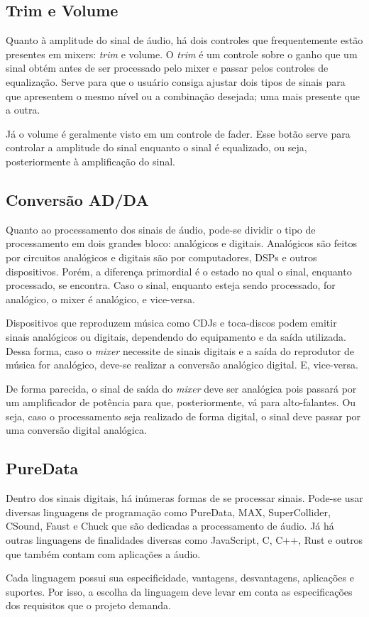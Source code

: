 \subsection{Trim e Volume}
Quanto à amplitude do sinal de áudio, há dois controles que frequentemente estão presentes em mixers: \textit{trim} e volume. O \textit{trim} é um controle sobre o ganho que um sinal obtém antes de ser processado pelo mixer e passar pelos controles de equalização. Serve para que o usuário consiga ajustar dois tipos de sinais para que apresentem o mesmo nível ou a combinação desejada; uma mais presente que a outra.
\par
Já o volume é geralmente visto em um controle de fader. Esse botão serve para controlar a amplitude do sinal enquanto o sinal é equalizado, ou seja, posteriormente à amplificação do sinal.

\subsection{Conversão AD/DA}
Quanto ao processamento dos sinais de áudio, pode-se dividir o tipo de processamento em dois grandes bloco: analógicos e digitais. Analógicos são feitos por circuitos analógicos e digitais são por computadores, DSPs e outros dispositivos. Porém, a diferença primordial é o estado no qual o sinal, enquanto processado, se encontra. Caso o sinal, enquanto esteja sendo processado, for analógico, o mixer é analógico, e vice-versa.
\par
Dispositivos que reproduzem música como CDJs e toca-discos podem emitir sinais analógicos ou digitais, dependendo do equipamento e da saída utilizada. 
Dessa forma, caso o \textit{mixer} necessite de sinais digitais e a saída do reprodutor de música for analógico, deve-se realizar a conversão analógico digital. E, vice-versa.
\par
De forma parecida, o sinal de saída do \textit{mixer} deve ser analógica pois passará por um amplificador de potência para que, posteriormente, vá para alto-falantes. Ou seja, caso o processamento seja realizado de forma digital, o sinal deve passar por uma conversão digital analógica.

\subsection{PureData}
Dentro dos sinais digitais, há inúmeras formas de se processar sinais. Pode-se usar diversas linguagens de programação como PureData, MAX, SuperCollider, CSound, Faust e Chuck que são dedicadas a processamento de áudio. Já há outras linguagens de finalidades diversas como JavaScript, C, C++, Rust e outros que também contam com aplicações a áudio.
\par
Cada linguagem possui sua especificidade, vantagens, desvantagens, aplicações e suportes. Por isso, a escolha da linguagem deve levar em conta as especificações dos requisitos que o projeto demanda.
\par

